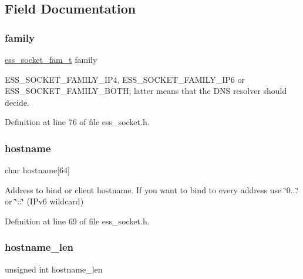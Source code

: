 \subsection{Field Documentation}
\mbox{\label{structess__socket_ad09623d57ebd33fef8dac4e18c0cba2f}} 
\subsubsection{\texorpdfstring{family}{family}}
{\footnotesize\ttfamily \hyperlink{ess__socket_8h_a9305eae437d57846661e997bb755d150}{ess\+\_\+socket\+\_\+fam\+\_\+t} family}

{\ttfamily E\+S\+S\+\_\+\+S\+O\+C\+K\+E\+T\+\_\+\+F\+A\+M\+I\+L\+Y\+\_\+\+I\+P4}, {\ttfamily E\+S\+S\+\_\+\+S\+O\+C\+K\+E\+T\+\_\+\+F\+A\+M\+I\+L\+Y\+\_\+\+I\+P6} or {\ttfamily E\+S\+S\+\_\+\+S\+O\+C\+K\+E\+T\+\_\+\+F\+A\+M\+I\+L\+Y\+\_\+\+B\+O\+TH}; latter means that the D\+NS resolver should decide. 

Definition at line 76 of file ess\+\_\+socket.\+h.

\mbox{\label{structess__socket_a0c6be700c8763c26054098348ebef8d6}} 
\subsubsection{\texorpdfstring{hostname}{hostname}}
{\footnotesize\ttfamily char hostname\mbox{[}64\mbox{]}}

Address to bind or client hostname. If you want to bind to every address use \char`\"{}0...\char`\"{} or \char`\"{}\+::\char`\"{} (I\+Pv6 wildcard) 

Definition at line 69 of file ess\+\_\+socket.\+h.

\mbox{\label{structess__socket_a4d0d74743d167680649419163ce8c80e}} 
\subsubsection{\texorpdfstring{hostname\+\_\+len}{hostname\_len}}
{\footnotesize\ttfamily unsigned int hostname\+\_\+len}



